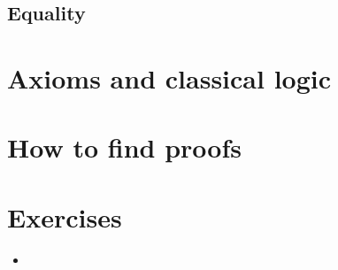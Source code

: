 \documentclass{beamer}
\begin{document}
\subsection{Equality}



\section{Axioms and classical logic}

\section{How to find proofs}

\section{Exercises}

\begin{frame}{}
\begin{itemize}
	\item 
\end{itemize}
\end{frame}
\end{document}
